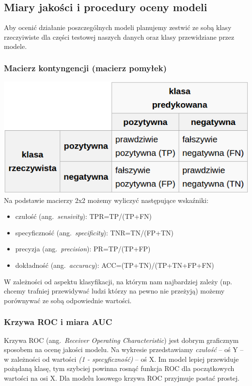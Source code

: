 \documentclass{article}
\newcommand{\ang}[1]{ang.~{\itshape #1}}
\begin{document}
\subsection{Miary jakości i procedury oceny modeli}
Aby ocenić działanie poszczególnych modeli planujemy zestwić ze sobą klasy rzeczyiwiste dla części testowej naszych danych oraz klasy przewidziane przez modele.

\subsubsection{Macierz kontyngencji (macierz pomyłek)}
\includegraphics[scale=0.5]{../pictures/tablicaPomylek}\\

Na podstawie macierzy 2x2 możemy wyliczyć następujące wskaźniki:
\begin{itemize}
\item czułość (\ang{sensivity}): TPR=TP/(TP+FN)
\item specyficzność (\ang{specificity}): TNR=TN/(FP+TN)
\item precyzja (\ang{precision}): PR=TP/(TP+FP)
\item dokładność (\ang{accuracy}): ACC=(TP+TN)/(TP+TN+FP+FN)
\end{itemize}

W zależności od aspektu klasyfikacji, na którym nam najbardziej zależy (np. chcemy trafniej przewidywać ludzi którzy na pewno nie przeżyją) możemy porównywać ze sobą odpowiednie wartości.

\subsubsection{Krzywa ROC i miara AUC}
Krzywa ROC (\ang{Receiver Operating Characteristic}) jest dobrym graficznym sposobem na ocenę jakości modelu. Na wykresie przedstawiamy {\itshape czułość} -- oś Y -- w zależności od wartości {\itshape (1 -  specyficzność)} -- oś X. Im model lepiej przewiduje pożądaną klasę, tym szybciej powinna rosnąć funkcja ROC dla początkowych wartości na osi X. Dla modelu losowego krzywa ROC przyjmuje postać prostej.
\end{document}

